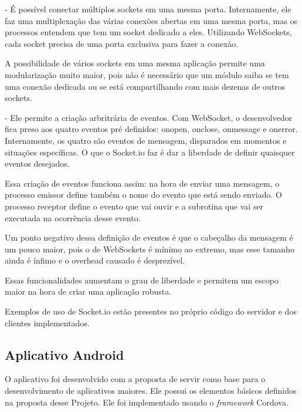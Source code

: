 \documentclass[a4paper,12pt]{article}
\begin{document}
- É possível conectar múltiplos sockets em uma mesma porta. Internamente, ele faz uma multiplexação das várias conexões abertas em uma mesma porta, mas os processos entendem que tem um socket dedicado a eles. Utilizando WebSockets, cada socket precisa de uma porta exclusiva para fazer a conexão.

A possibilidade de vários sockets em uma mesma aplicação permite uma modularização muito maior, pois não é necessário que um módulo saiba se tem uma conexão dedicada ou se está compartilhando com mais dezenas de outros sockets.

- Ele permite a criação arbritrária de eventos. Com WebSocket, o desenvolvedor fica preso aos quatro eventos pré definidos: onopen, onclose, onmessage e onerror. Internamente, os quatro são eventos de mensagem, disparados em momentos e situações específicas. O que o Socket.io faz é dar a liberdade de definir quaisquer eventos desejados.

Essa criação de eventos funciona assim: na hora de enviar uma mensagem, o processo emissor define também o nome do evento que está sendo enviado. O processo receptor define o evento que vai ouvir e a subrotina que vai ser executada na ocorrência desse evento.

Um ponto negativo dessa definição de eventos é que o cabeçalho da mensagem é um pouco maior, pois o de WebSockets é mínimo ao extremo, mas esse tamanho ainda é ínfimo e o overhead causado é desprezível.

Essas funcionalidades aumentam o grau de liberdade e permitem um escopo maior na hora de criar uma aplicação robusta. %

Exemplos de uso de Socket.io estão presentes no próprio código do servidor e dos clientes implementados.



\subsection{Aplicativo Android}

O aplicativo foi desenvolvido com a proposta de servir como base para o desenvolvimento de aplicativos maiores. Ele possui os elementos básicos definidos na proposta desse Projeto. Ele foi implementado usando o \emph{framework} Cordova.
\end{document}
